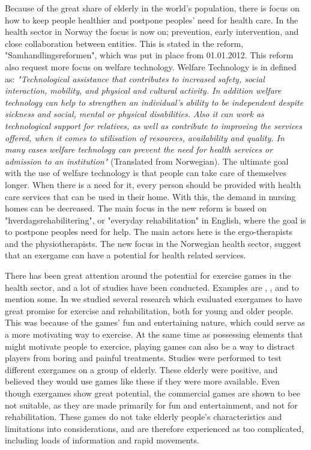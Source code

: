 Because of the great share of elderly in the world's population, there is focus on how to keep people healthier and postpone peoples' need for health care.  In the health sector in Norway the focus is now on; prevention, early intervention, and close collaboration between entities. This is stated in the reform, "Samhandlingsreformen", which was put in place from 01.01.2012. This reform also request more focus on welfare technology. Welfare Technology is in \cite{welfare} defined as: \emph{"Technological assistance that contributes to increased safety, social interaction, mobility, and physical and cultural activity. In addition welfare technology can help to strengthen an individual's ability to be independent despite sickness and social, mental or physical disabilities. Also it can work as technological support for relatives, as well as contribute to improving the services offered, when it comes to utilisation of resources, availability and quality. In many cases welfare technology can prevent the need for health services or admission to an institution"} (Translated from Norwegian). The ultimate goal with the use of welfare technology is that people can take care of themselves longer. When there is a need for it, every person should be provided with health care services that can be used in their home. With this, the demand in nursing homes can be decreased. The main focus in the new reform is based on "hverdagsrehabilitering", or "everyday rehabilitation" in English, where the goal is to postpone peoples need for help. The main actors here is the ergo-therapists and the physiotherapists. The new focus in the Norwegian health sector, suggest that an exergame can have a potential for health related services.

There has been great attention around the potential for exercise games in the health sector, and a lot of studies have been conducted. Examples are \cite{exergamesforelderly}, \cite{gerling1}, \cite{ijsselsteijn2007digital} and \cite{garcia2012exergames} to mention some. In \cite{project} we studied several research which evaluated exergames to have great promise for exercise and rehabilitation, both for young and older people. This was because of the games' fun and entertaining nature, which could serve as a more motivating way to exercise. At the same time as possessing elements that might motivate people to exercice, playing games can also be a way to distract players from boring and painful treatments. Studies were performed to test different exergames on a group of elderly. These elderly were positive, and believed they would use games like these if they were more available. Even though exergames show great potential, the commercial games  are shown to bee not suitable, as they are made primarily for fun and entertainment, and not for rehabilitation. These games do not take elderly people's characteristics and limitations into considerations, and are therefore experienced as too complicated, including loads of information and rapid movements.

